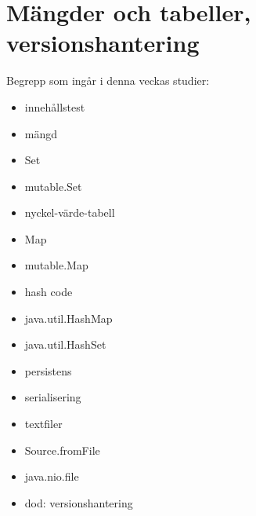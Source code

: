 \chapter{Mängder och tabeller, versionshantering}\label{chapter:W09}
Begrepp som ingår i denna veckas studier:
\begin{itemize}[noitemsep,label={$\square$},leftmargin=*]
\item innehållstest
\item mängd
\item Set
\item mutable.Set
\item nyckel-värde-tabell
\item Map
\item mutable.Map
\item hash code
\item java.util.HashMap
\item java.util.HashSet
\item persistens
\item serialisering
\item textfiler
\item Source.fromFile
\item java.nio.file
\item dod: versionshantering\end{itemize}
